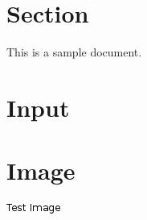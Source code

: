 \documentclass{article}
\begin{document}
\section{Section}
This is a sample document.

\section{Input}



\section{Image}
\includegraphics{image/dummy1.png}
\end{document}

